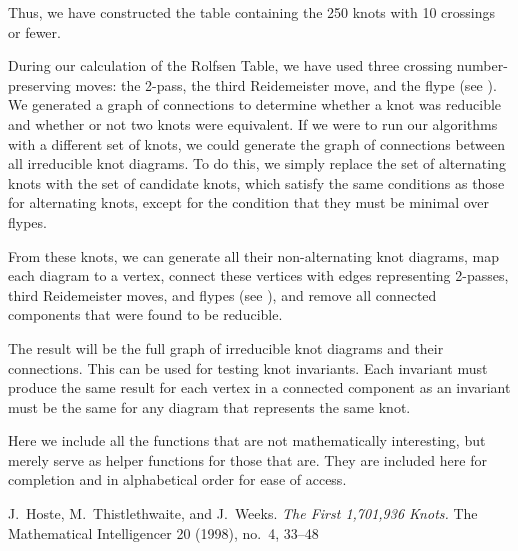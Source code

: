 \begin{paper}

Thus, we have constructed the table containing the 250 knots with 10 crossings
or fewer.



During our calculation of the Rolfsen Table, we have used three crossing
number-preserving moves: the 2-pass, the third Reidemeister move, and the flype
(see \figMoves).
We generated a graph of connections to determine whether a knot was reducible
and whether or not two knots were equivalent.
If we were to run our algorithms with a different set of knots, we could
generate the graph of connections between all irreducible knot diagrams.
To do this, we simply replace the set of alternating knots with the set of
candidate knots, which satisfy the same conditions as those for alternating
knots, except for the condition that they must be minimal over flypes.

From these knots, we can generate all their non-alternating knot diagrams,
map each diagram to a vertex, connect these vertices with edges representing
2-passes, third Reidemeister moves, and flypes (see \figMoves), and remove all
connected components that were found to be reducible.


The result will be the full graph of irreducible knot diagrams and their
connections.
This can be used for testing knot invariants.
Each invariant must produce the same result for each vertex in a connected
component as an invariant must be the same for any diagram that represents the
same knot.


Here we include all the functions that are not mathematically interesting, but
merely serve as helper functions for those that are.
They are included here for completion and in alphabetical order for ease of
access.















\begin{thebibliography}{}
J.~Hoste, M.~Thistlethwaite, and J.~Weeks.
\textit{The First 1,701,936 Knots.}
The Mathematical Intelligencer 20 (1998), no.~4, 33--48
\end{thebibliography}


\end{paper}

